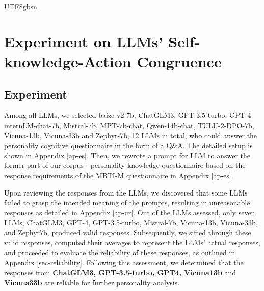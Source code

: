 \documentclass{article}
\theoremstyle{plain}
\theoremstyle{definition}
\theoremstyle{remark}
\begin{document}
\begin{CJK*}{UTF8}{gbsn}

\section{Experiment on LLMs' Self-knowledge-Action Congruence} \label{sec k-a}

\subsection{Experiment}

Among all LLMs, we selected baize-v2-7b, ChatGLM3, GPT-3.5-turbo, GPT-4, internLM-chat-7b, Mistral-7b, MPT-7b-chat, Qwen-14b-chat, TULU-2-DPO-7b, Vicuna-13b, Vicuna-33b and Zephyr-7b, 12 LLMs in total, who could answer the personality cognitive questionnaire in the form of a Q$\&$A. The detailed setup is shown in Appendix \ref{ap-es}. Then, we rewrote a prompt for LLM to answer the former part of our corpus - personality knowledge questionnaire based on the response requirements of the MBTI-M questionnaire \citep{gu2012mbti} in Appendix \ref{ap-es}.

Upon reviewing the responses from the LLMs, we discovered that some LLMs failed to grasp the intended meaning of the prompts, resulting in unreasonable responses as detailed in Appendix \ref{ap-ur}. Out of the LLMs assessed, only seven LLMs, ChatGLM3, GPT-4, GPT-3.5-turbo, Mistral-7b, Vicuna-13b, Vicuna-33b, and Zephyr7b, produced valid responses. Subsequently, we sifted through these valid responses, computed their averages to represent the LLMs' actual responses, and proceeded to evaluate the reliability of these responses, as outlined in Appendix \ref{sec-reliability}. Following this assessment, we determined that the responses from \textbf{ChatGLM3, GPT-3.5-turbo, GPT4, Vicuna13b} and \textbf{Vicuna33b} are reliable for further personality analysis.


\end{CJK*}
\end{document}
